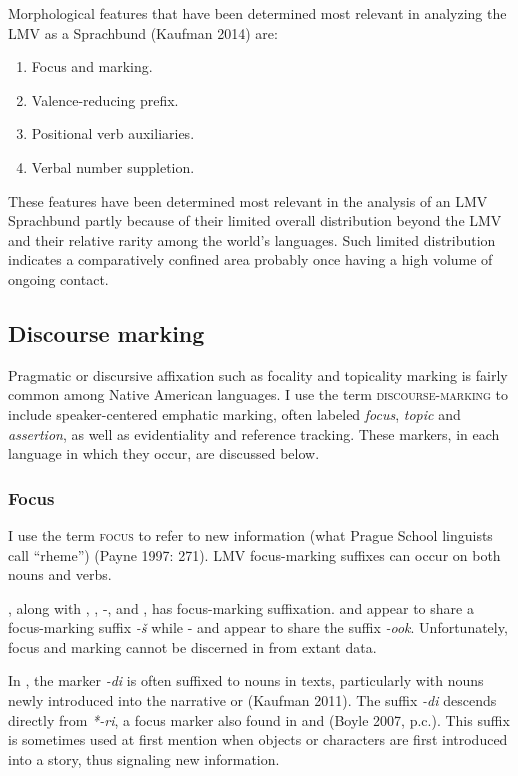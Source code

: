 \documentclass[output=paper]{LSP/langsci}
\begin{document}
	Morphological features that have been determined most relevant in analyzing the LMV as a Sprachbund (Kaufman 2014) are:

\begin{enumerate}
\item{Focus and  marking.}
\item{Valence-reducing prefix.}
\item{Positional verb auxiliaries.}
\item{Verbal number suppletion.}
\end{enumerate}
 
These features have been determined most relevant in the analysis of an LMV Sprachbund partly because of their limited overall distribution beyond the LMV and their relative rarity among the world’s languages. Such limited distribution indicates a comparatively confined area probably once having a high volume of ongoing contact.

\subsection{Discourse marking}

Pragmatic or discursive affixation such as focality and topicality marking is fairly common among Native American languages. I use the term \textsc{discourse-marking} to include speaker-centered emphatic marking, often labeled \emph{focus}, \emph{topic} and \emph{assertion}, as well as evidentiality and reference tracking. These markers, in each language in which they occur, are discussed below.

\subsubsection{Focus}
	
I use the term \textsc{focus} to refer to new information (what Prague School linguists call “rheme”) (Payne 1997: 271). LMV focus-marking suffixes can occur on both nouns and verbs.

	, along with , , -, and , has focus-marking suffixation.  and  appear to share a focus-marking suffix \emph{-š} while - and  appear to share the suffix \emph{-ook}. Unfortunately, focus and  marking cannot be discerned in  from extant data.

In , the marker \emph{-di} is often suffixed to nouns in texts, particularly with nouns newly introduced into the narrative or  (Kaufman 2011). The suffix \emph{-di} descends directly from  \emph{*-ri}, a focus marker also found in  and  (Boyle 2007, p.c.). This suffix is sometimes used at first mention when objects or characters are first introduced into a story, thus signaling new information. 
\end{document}
